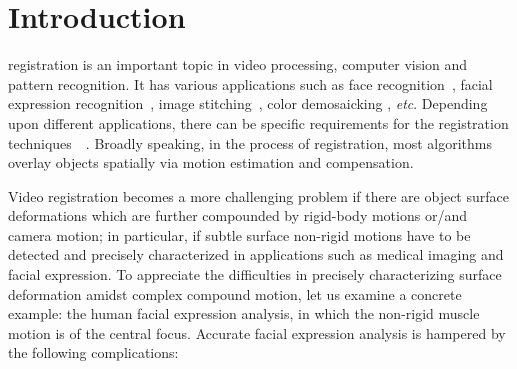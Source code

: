 \documentclass[10pt,journal]{IEEEtran}
\begin{document}
\maketitle


\IEEEdisplaynotcompsoctitleabstractindextext


%
\IEEEpeerreviewmaketitle


\section{Introduction\label{sec:intro}}

 registration is an important topic in video processing, computer vision and pattern recognition. It has various applications such as face recognition~\cite{Wagner2009}, facial expression recognition~\cite{Valstar12}, image stitching~\cite{Szeliski06}, color demosaicking \cite{Wu_TIP06}, \textit{etc}. Depending upon different applications, there can be specific requirements for the registration techniques~\cite{Uenohara95}~\cite{Caspi_PAMI02}. Broadly speaking, in the process of registration, most algorithms overlay objects spatially via motion estimation and compensation. 

Video registration becomes a more challenging problem if there are object surface deformations which are further compounded by rigid-body motions or/and camera motion; in particular, if subtle surface non-rigid motions have to be detected and precisely characterized in applications such as medical imaging and facial expression. To appreciate the difficulties in precisely characterizing surface deformation amidst complex compound motion, let us examine a concrete example: the human facial expression analysis, in which the non-rigid muscle motion is of the central focus.  Accurate facial expression analysis is hampered by the following complications:
\end{document}
